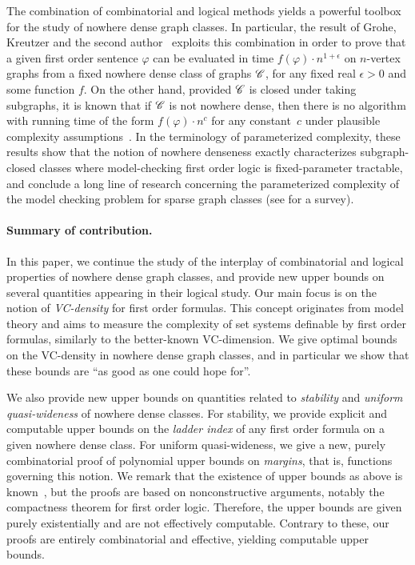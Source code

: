The combination of combinatorial and logical methods yields a powerful toolbox for the study
of nowhere dense graph classes. In particular, 
the result of Grohe, Kreutzer and the second author~\cite{grohe2014deciding} exploits 
this combination in order to prove that  a given
first order sentence $\varphi$ can be evaluated in time 
$f(\varphi)\cdot n^{1+\epsilon}$ on $n$-vertex graphs from a fixed nowhere dense class of graphs $\mathscr{C}$, for any fixed real $\epsilon>0$ and some function $f$.
On the other hand, provided $\mathscr{C}$ is closed under taking subgraphs, it is known that if $\mathscr{C}$ is not nowhere dense,
then there is no algorithm with running time of the form $f(\varphi)\cdot n^c$ for any constant~$c$ under plausible complexity assumptions~\cite{dvovrak2013testing}.
In the terminology of parameterized complexity, these results show that the notion of nowhere denseness exactly characterizes subgraph-closed classes where model-checking first order logic
is fixed-parameter tractable, and conclude a long line of research concerning the parameterized complexity of the model checking problem for sparse graph classes (see \cite{grokre11} for a survey). 


\paragraph{Summary of contribution.} In this paper, we continue the study of the 
interplay of combinatorial and logical properties
of nowhere dense graph classes, and provide
new upper bounds on several
quantities appearing in their logical study.
Our main focus is on the notion of \emph{VC-density} for first order formulas. This concept originates from model theory and 
aims to measure the complexity of set systems definable by first order formulas, similarly to the better-known VC-dimension.
We give optimal bounds on the VC-density in nowhere dense graph classes, and in particular we show that these bounds are ``as good as one could hope for''.

We also provide new upper bounds on quantities related to {\em{stability}} and {\em{uniform quasi-wideness}} of nowhere dense classes.
For stability, we provide explicit and computable upper bounds on the \emph{ladder index} of any first order formula on a given nowhere dense class.
For uniform quasi-wideness, we give a new, purely combinatorial proof of polynomial upper bounds on {\em{margins}}, that is, functions governing this notion.
We remark that the existence of upper bounds as above is known~\cite{adler2014interpreting,siebertz2016polynomial}, but the proofs are based on nonconstructive arguments, 
notably the compactness theorem for first order logic. Therefore, the upper bounds are given purely existentially and are not effectively computable.
Contrary to these, our proofs are entirely combinatorial and effective, yielding computable upper bounds.

